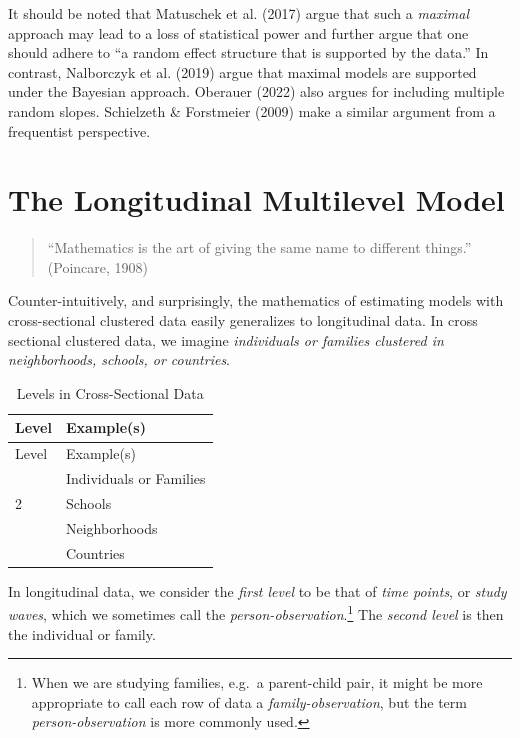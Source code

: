 \documentclass[
  letterpaper,
  DIV=11,
  numbers=noendperiod]{scrreprt}
\begin{document}
It should be noted that Matuschek et al. (2017) argue that such a
\emph{maximal} approach may lead to a loss of statistical power and
further argue that one should adhere to ``a random effect structure that
is supported by the data.'' In contrast, Nalborczyk et al. (2019) argue
that maximal models are supported under the Bayesian approach. Oberauer
(2022) also argues for including multiple random slopes. Schielzeth \&
Forstmeier (2009) make a similar argument from a frequentist
perspective.


\chapter{The Longitudinal Multilevel
Model}\label{the-longitudinal-multilevel-model}

\begin{quote}
``Mathematics is the art of giving the same name to different things.''
(Poincare, 1908)
\end{quote}

Counter-intuitively, and surprisingly, the mathematics of estimating
models with cross-sectional clustered data easily generalizes to
longitudinal data. In cross sectional clustered data, we imagine
\emph{individuals or families clustered in neighborhoods, schools, or
countries}.

\begin{longtable}[]{@{}ll@{}}
\caption{Levels in Cross-Sectional
Data}\label{tbl-levelscrosssectional}\tabularnewline
\toprule\noalign{}
Level & Example(s) \\
\midrule\noalign{}
\endfirsthead
\toprule\noalign{}
Level & Example(s) \\
\midrule\noalign{}
\endhead
\bottomrule\noalign{}
\endlastfoot
1 & Individuals or Families \\
2 & Schools \\
& Neighborhoods \\
& Countries \\
\end{longtable}

In longitudinal data, we consider the \emph{first level} to be that of
\emph{time points}, or \emph{study waves}, which we sometimes call the
\emph{person-observation}.\footnote{When we are studying families,
  e.g.~a parent-child pair, it might be more appropriate to call each
  row of data a \emph{family-observation}, but the term
  \emph{person-observation} is more commonly used.} The \emph{second
level} is then the individual or family.
\end{document}

